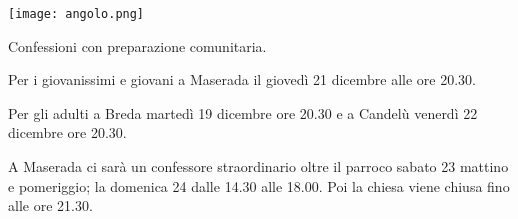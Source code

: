 \begin{center}
\vspace{1em}

\begin{minipage}{0.25\textwidth}
\texttt{[image: angolo.png]}
\end{minipage}
\hfill
\begin{minipage}{0.72\textwidth}
Confessioni con preparazione comunitaria.

Per i giovanissimi e giovani a Maserada il giovedì 21 dicembre alle ore 20.30.

Per gli adulti a Breda martedì 19 dicembre ore 20.30 e a Candelù venerdì 22 dicembre ore 20.30.

A Maserada ci sarà un confessore straordinario oltre il parroco sabato 23 mattino e pomeriggio; la domenica 24 dalle 14.30 alle 18.00. Poi la chiesa viene chiusa fino alle ore 21.30.
\end{minipage}
\end{center}


\normalsize
